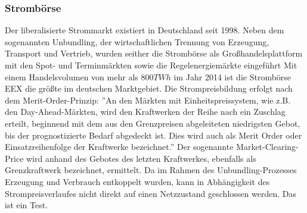 \documentclass[onecolumn,10pt,titlepage]{article}
\begin{document}
\subsubsection{Strombörse}
Der liberalisierte  Strommarkt  existiert in Deutschland seit 1998. Neben dem sogenannten Unbundling, der wirtschaftlichen Trennung von Erzeugung, Transport und Vertrieb, wurden seither die Strombörse als Großhandelsplattform mit den Spot- und Terminmärkten sowie die Regelenergiemärkte eingeführt Mit einem Handelsvolumen von mehr als $800 TWh$ im Jahr 2014 ist die Strombörse EEX die größte im deutschen Marktgebiet.\cite{Zapf.2017} Die Strompreisbildung erfolgt nach dem Merit-Order-Prinzip: ''An den Märkten mit Einheitspreissystem, wie z.B. den Day-Ahead-Märkten, wird den Kraftwerken der Reihe nach ein Zuschlag erteilt, beginnend mit dem aus den Grenzpreisen abgeleiteten niedrigsten Gebot, bis der prognostizierte Bedarf abgedeckt ist. Dies wird auch als Merit Order oder Einsatzreihenfolge der Kraftwerke bezeichnet.''\cite{Zapf.2017} Der sogenannte Market-Clearing-Price wird anhand des Gebotes des letzten Kraftwerkes, ebenfalls als Grenzkraftwerk bezeichnet, ermittelt.
Da im Rahmen des Unbundling-Prozesses Erzeugung und Verbrauch entkoppelt wurden, kann in Abhängigkeit des Strompreisverlaufes nicht direkt auf einen Netzzustand geschlossen werden.\cite{Zapf.2017}
Das ist ein Test.
\end{document}
